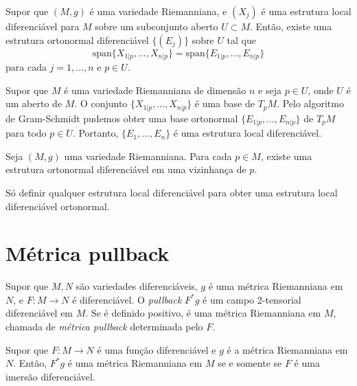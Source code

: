 \begin{proposicao}
	Supor que $(M,g)$ é uma variedade Riemanniana, e $(X_j)$ é uma estrutura local diferenciável para $M$ sobre um subconjunto aberto $U \subset M$. Então, existe uma estrutura ortonormal diferenciável $\{ (E_j)\}$ sobre $U$ tal que
	\begin{equation*}
		\text{span} \{ X_{1|p}, \ldots, X_{n|p} \} = \text{span} \{ E_{1|p}, \ldots, E_{n|p} \}
	\end{equation*}
	para cada $ j=1, \ldots, n $ e $p \in U$.
\end{proposicao}

\begin{demonstracao}
	Supor que $M$ é uma variedade Riemanniana de dimensão $n$ e seja $p \in U$, onde $U$ é um aberto de $M$. O conjunto $\{ X_{1|p},\ldots,X_{n|p} \}$ é uma base de $T_pM$. Pelo algoritmo de Gram-Schmidt pudemos obter uma base ortonormal $\{ E_{1|p},\ldots,E_{n|p} \}$ de $T_pM$ para todo $p \in U$. Portanto, $\{ E_1,\ldots,E_n \}$ é uma estrutura local diferenciável.
\end{demonstracao}

\begin{corolario}
	Seja $(M,g)$ uma variedade Riemanniana. Para cada $p \in M$, existe uma estrutura ortonormal diferenciável em uma vizinhança de $p$.
\end{corolario}

\begin{demonstracao}
	Só definir qualquer estrutura local diferenciável para obter uma estrutura local diferenciável ortonormal.
\end{demonstracao}

\section{Métrica pullback}

\begin{definicao}\label{metrica_pullback}
	Supor que $M,N$ são variedades diferenciáveis, $g$ é uma métrica Riemanniana em $N$, e $F: M \rightarrow N$ é diferenciável. O \emph{pullback} $F^* g$ é um campo 2-tensorial diferenciável em $M$. Se é definido positivo, é uma métrica Riemanniana em $M$, chamada de \emph{métrica pullback} determinada pelo $F$.
\end{definicao}

\begin{proposicao}
	Supor que $F: M \rightarrow N$ é uma função diferenciável e $g$ é a métrica Riemanniana em $N$. Então, $F^* g$ é uma métrica Riemanniana em $M$ se e somente se $F$ é uma imersão diferenciável.
\end{proposicao}

